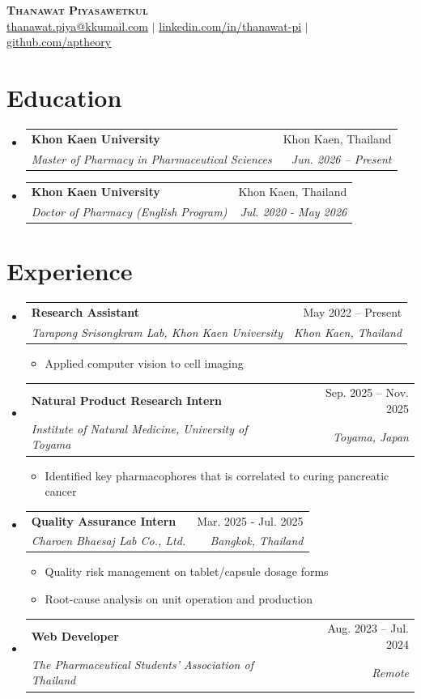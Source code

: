 \documentclass[letterpaper,11pt]{article}
\makeatletter
\newcommand{\resumeItem}[1]{
	\item\small{
		{#1 \vspace{-2pt}}
	}
}
\newcommand{\resumeSubheading}[4]{
	\vspace{-2pt}\item
	\begin{tabular*}{0.97\textwidth}[t]{l@{\extracolsep{\fill}}r}
		\textbf{#1} & #2 \\
		\textit{\small#3} & \textit{\small #4} \\
	\end{tabular*}\vspace{-7pt}
}
\newcommand{\resumeSubHeadingListStart}{\begin{itemize}[leftmargin=0.15in, label={}]}
\newcommand{\resumeSubHeadingListEnd}{\end{itemize}}
\newcommand{\resumeItemListStart}{\begin{itemize}}
\newcommand{\resumeItemListEnd}{\end{itemize}\vspace{-5pt}}
\makeatother
\begin{document}
	
	\begin{center}
		\textbf{\Huge \scshape Thanawat Piyasawetkul} \\ \vspace{1pt}
		\href{mailto:thanawat.piya@kkumail.com}{\underline{thanawat.piya@kkumail.com}} $|$ 
		\href{https://linkedin.com/in/thanawat-pi}{\underline{linkedin.com/in/thanawat-pi}} $|$
		\href{https://github.com/aptheory}{\underline{github.com/aptheory}}
	\end{center}
	
	
	\section{Education}
	\resumeSubHeadingListStart
	\resumeSubheading
		{Khon Kaen University}{Khon Kaen, Thailand}
		{Master of Pharmacy in Pharmaceutical Sciences}{Jun. 2026 -- Present}
	\resumeSubheading
		{Khon Kaen University}{Khon Kaen, Thailand}
		{Doctor of Pharmacy (English Program)}{Jul. 2020 - May 2026}
	\resumeSubHeadingListEnd
	
	
	\section{Experience}
	\resumeSubHeadingListStart
	
	\resumeSubheading
		{Research Assistant}{May 2022 -- Present}
		{Tarapong Srisongkram Lab, Khon Kaen University}{Khon Kaen, Thailand}
		\resumeItemListStart
		\resumeItem{Applied computer vision to cell imaging}
		\resumeItemListEnd
	
	\resumeSubheading
		{Natural Product Research Intern}{Sep. 2025 -- Nov. 2025}
		{Institute of Natural Medicine, University of Toyama}{Toyama, Japan}
		\resumeItemListStart
		\resumeItem{Identified key pharmacophores that is correlated to curing pancreatic cancer}
		\resumeItemListEnd
	
	\resumeSubheading
		{Quality Assurance Intern}{Mar. 2025 - Jul. 2025}
		{Charoen Bhaesaj Lab Co., Ltd.}{Bangkok, Thailand}
		\resumeItemListStart
		\resumeItem{Quality risk management on tablet/capsule dosage forms}
		\resumeItem{Root-cause analysis on unit operation and production}
		\resumeItemListEnd
	
	\resumeSubheading
		{Web Developer}{Aug. 2023 -- Jul. 2024}
		{The Pharmaceutical Students' Association of Thailand}{Remote}
	
	\resumeSubHeadingListEnd
	
\end{document}
